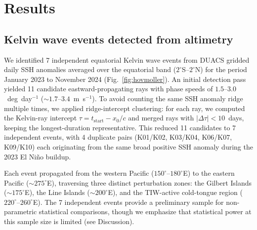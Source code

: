 \documentclass[11pt]{article}
\begin{document}
\section{Results}
\label{sec:results}

\subsection{Kelvin wave events detected from altimetry}

We identified 7 independent equatorial Kelvin wave events from DUACS gridded daily SSH anomalies averaged over the equatorial band ($2^\circ$S--$2^\circ$N) for the period January 2023 to November 2024 (Fig.~\ref{fig:hovmoller}). An initial detection pass yielded 11 candidate eastward-propagating rays with phase speeds of $1.5$--$3.0$~deg~day$^{-1}$ (${\sim}1.7$--$3.4$~m~s$^{-1}$). To avoid counting the same SSH anomaly ridge multiple times, we applied ridge-intercept clustering: for each ray, we computed the Kelvin-ray intercept $\tau = t_\mathrm{start} - x_0/c$ and merged rays with $|\Delta\tau| < 10$~days, keeping the longest-duration representative. This reduced 11 candidates to 7 independent events, with 4 duplicate pairs (K01/K02, K03/K04, K06/K07, K09/K10) each originating from the same broad positive SSH anomaly during the 2023 El Ni\~no buildup.

Each event propagated from the western Pacific ($150^\circ$--$180^\circ$E) to the eastern Pacific (${\sim}275^\circ$E), traversing three distinct perturbation zones: the Gilbert Islands (${\sim}175^\circ$E), the Line Islands (${\sim}200^\circ$E), and the TIW-active cold-tongue region ($220^\circ$--$260^\circ$E). The 7 independent events provide a preliminary sample for non-parametric statistical comparisons, though we emphasize that statistical power at this sample size is limited (see Discussion).
\end{document}
